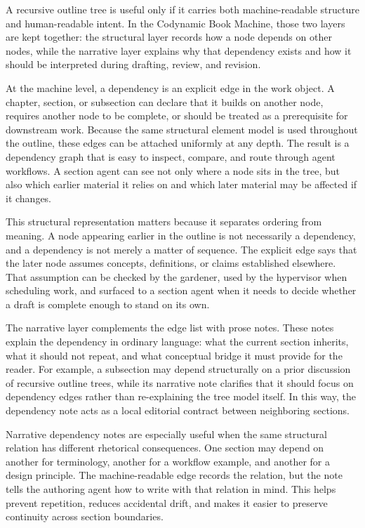 A recursive outline tree is useful only if it carries both machine-readable structure and human-readable intent. In the Codynamic Book Machine, those two layers are kept together: the structural layer records how a node depends on other nodes, while the narrative layer explains why that dependency exists and how it should be interpreted during drafting, review, and revision.

At the machine level, a dependency is an explicit edge in the work object. A chapter, section, or subsection can declare that it builds on another node, requires another node to be complete, or should be treated as a prerequisite for downstream work. Because the same structural element model is used throughout the outline, these edges can be attached uniformly at any depth. The result is a dependency graph that is easy to inspect, compare, and route through agent workflows. A section agent can see not only where a node sits in the tree, but also which earlier material it relies on and which later material may be affected if it changes.

This structural representation matters because it separates ordering from meaning. A node appearing earlier in the outline is not necessarily a dependency, and a dependency is not merely a matter of sequence. The explicit edge says that the later node assumes concepts, definitions, or claims established elsewhere. That assumption can be checked by the gardener, used by the hypervisor when scheduling work, and surfaced to a section agent when it needs to decide whether a draft is complete enough to stand on its own.

The narrative layer complements the edge list with prose notes. These notes explain the dependency in ordinary language: what the current section inherits, what it should not repeat, and what conceptual bridge it must provide for the reader. For example, a subsection may depend structurally on a prior discussion of recursive outline trees, while its narrative note clarifies that it should focus on dependency edges rather than re-explaining the tree model itself. In this way, the dependency note acts as a local editorial contract between neighboring sections.

Narrative dependency notes are especially useful when the same structural relation has different rhetorical consequences. One section may depend on another for terminology, another for a workflow example, and another for a design principle. The machine-readable edge records the relation, but the note tells the authoring agent how to write with that relation in mind. This helps prevent repetition, reduces accidental drift, and makes it easier to preserve continuity across section boundaries.

